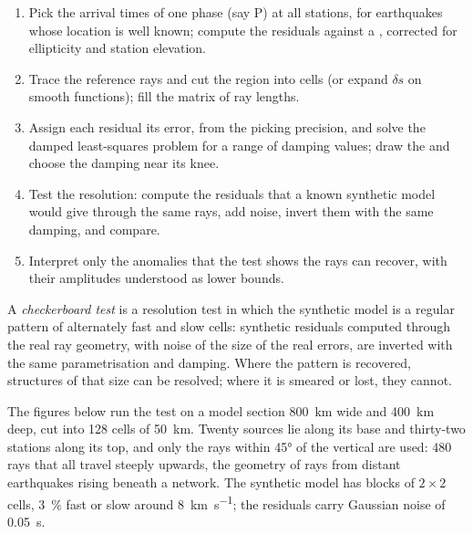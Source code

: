 \begin{method}\label{met:b3:seismology-imaging:tomo}
\begin{enumerate}
  \item Pick the arrival times of one phase (say P) at all stations, for
        earthquakes whose location is well known; compute the residuals
        against a , corrected for ellipticity and station
        elevation.
  \item Trace the reference rays and cut the region into cells (or expand
        $\delta s$ on smooth functions); fill the matrix of ray lengths.
  \item Assign each residual its error, from the picking precision, and solve
        the damped least-squares problem for a range of damping values; draw
        the  and choose the damping near its knee.
  \item Test the resolution: compute the residuals that a known synthetic
        model would give through the same rays, add noise, invert them with the
        same damping, and compare.
  \item Interpret only the anomalies that the test shows the rays can
        recover, with their amplitudes understood as lower bounds.
\end{enumerate}
\end{method}

\begin{definition}\label{def:b3:seismology-imaging:checkerboard}
A \emph{checkerboard test} is a resolution test in
which the synthetic model is a regular pattern of alternately fast and slow
cells: synthetic residuals computed through the real ray geometry, with noise
of the size of the real errors, are inverted with the same parametrisation and
damping. Where the pattern is recovered, structures of that size can be
resolved; where it is smeared or lost, they cannot.
\end{definition}

The figures below run the test on a model section \qty{800}{km} wide and
\qty{400}{km} deep, cut into 128 cells of \qty{50}{km}. Twenty sources lie
along its base and thirty-two stations along its top, and only the rays within
\ang{45} of the vertical are used: 480 rays that all travel steeply upwards,
the geometry of rays from distant earthquakes rising beneath a network. The
synthetic model has blocks of $2\times2$ cells, \qty{3}{\percent} fast or slow
around \qty{8}{km.s^{-1}}; the residuals carry Gaussian noise of
\qty{0.05}{s}.

